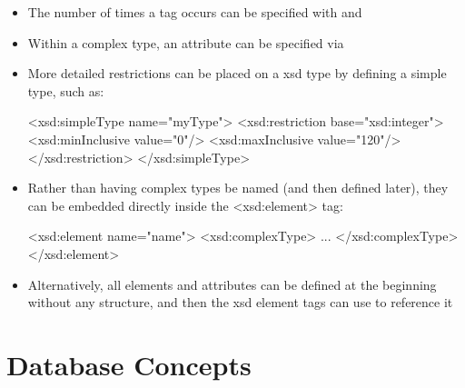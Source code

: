 \documentclass[a4paper]{article}
\begin{document}
\begin{itemize}
    \item The number of times a tag occurs can be specified with  and 
    \item Within a complex type, an attribute can be specified via 
    \item More detailed restrictions can be placed on a xsd type by defining a simple type, such as:
\begin{xml}
<xsd:simpleType name="myType">
  <xsd:restriction base="xsd:integer">
    <xsd:minInclusive value="0"/>
    <xsd:maxInclusive value="120"/>
  </xsd:restriction>
</xsd:simpleType>
\end{xml}
	\item Rather than having complex types be named (and then defined later), they can be embedded directly inside the <xsd:element> tag:
\begin{xml}
<xsd:element name="name">
  <xsd:complexType>
    ...
  </xsd:complexType>
</xsd:element>
\end{xml}
	\item Alternatively, all elements and attributes can be defined at the beginning without any structure, and then the xsd element tags can use  to reference it
\end{itemize}

\section{Database Concepts}
\end{document}

